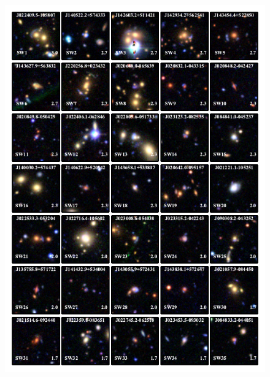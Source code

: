 \documentclass[useAMS,usenatbib,a4paper]{mn2e}
\begin{document}
\begin{figure}
\begin{center}
\includegraphics[scale=1.9]{lenscandfin.pdf}
\end{center}
\end{figure}
\end{document}
